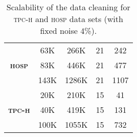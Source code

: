 \begin{table}[t]
\begin{tabular}{@{}ccccc@{}}
\midrule
                     & 63K                                                              & 266K                                                        & 21                                                                                                                                        & 242                                                           \\
{\bf \textsc{hosp}}           & 83K                                                              & 446K                                                        & 21                                                                                                                                        & 477                                                           \\
\multicolumn{1}{l}{} & 143K                                                             & 1286K                                                        & 21                                                                                                                                        & 1107                                                          \\ \midrule
\multicolumn{1}{l}{} & 20K                                                              & 210K                                                        & 15                                                                                                                                        & 41                                                            \\
{\bf \textsc{tpc-h}}           & 40K                                                              & 419K                                                        & 15                                                                                                                                        & 131                                                           \\
\multicolumn{1}{l}{} & 100K                                                             & 1055K                                                        & 15                                                                                                                                        & 732                                                           \\ \bottomrule
\end{tabular}
\caption{\label{tab:runtime} Scalability of the data cleaning for \textsc{tpc-h} and \textsc{hosp} data sets (with fixed noise 4\%). }
\end{table}


